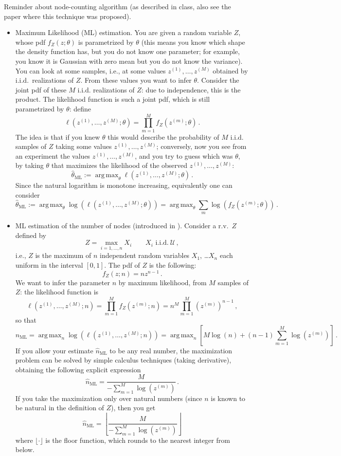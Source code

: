 \documentclass{article}
\DeclareMathOperator*{\argmax}{arg \, max}
\begin{document}
Reminder about node-counting algorithm (as described in class, also see the paper \cite{node-counting} where this technique was proposed).
\begin{itemize}
\item Maximum Likelihood (ML) estimation. You are given a random variable $Z$, whose pdf
$f_Z(z;\theta)$ is parametrized by $\theta$ (this means you know which shape the density function has, but you do not know one parameter; for example, you know it is Gaussian with zero mean but you do not know the variance). You can look at some samples, i.e., at some values $z^{(1)}, \dots, z^{(M)}$ obtained by  i.i.d.~realizations of $Z$. From these values you want to infer $\theta$. Consider the joint pdf of these $M$ i.i.d. realizations of $Z$: due to independence, this is the product. The likelihood function is such a joint pdf, which is still parametrized by $\theta$: define
\[ \ell(z^{(1)}, \dots, z^{(M)}; \theta) = \prod_{m=1}^M f_Z(z^{(m)}; \theta) \,. \]
The idea is that if you knew $\theta$ this would describe the probability of $M$ i.i.d. samples of $Z$ taking some values $z^{(1)}, \dots, z^{(M)}$; conversely, now you see from an experiment the values $z^{(1)}, \dots, z^{(M)}$, and you try to guess which was $\theta$, by taking $\theta$ that maximizes the likelihood of the observed $z^{(1)}, \dots, z^{(M)}$:
\[ \hat \theta_{\mathrm{ML}} := \argmax_{\theta} \ell(z^{(1)}, \dots, z^{(M)}; \theta) \,. \]
Since the natural logarithm is monotone increasing, equivalently one can consider
\[ \hat \theta_{\mathrm{ML}} := \argmax_{\theta} \log (\ell(z^{(1)}, \dots, z^{(M)}; \theta))
= \argmax_{\theta} \sum_{m} \log (f_Z(z^{(m)}; \theta)) \,.\]
\item ML estimation of the number of nodes (introduced in \cite{node-counting}).
Consider a r.v.~$Z$ defined by
\[Z = \max_{i=1, \dots, n} X_i \qquad X_i \text{ i.i.d.}~\mathcal U \, ,\]
i.e., $Z$ is the maximum of $n$ independent random variables $X_1$, \dots $X_n$ each uniform in the interval $[0,1]$.
The pdf of $Z$ is the following:
\[ f_Z(z;n) = n z^{n-1} \,.\]
We want to infer the parameter $n$ by maximum likelihood, from $M$ samples of $Z$:
the likelihood function is
\[ \ell(z^{(1)}, \dots, z^{(M)}; n) = \prod_{m=1}^M f_Z(z^{(m)}; n) = n^M \prod_{m=1}^M (z^{(m)})^{n-1} \,, \]
so that
\[ \hat n_{\mathrm{ML}} = \argmax_n \log(\ell(z^{(1)}, \dots, z^{(M)}; n))
= \argmax_n [ M \log(n) +(n-1) \sum_{m=1}^M \log(z^{(m)}) ] \,.\]
If you allow your estimate $\hat n_{\mathrm{ML}} $ to be any real number, the maximization problem
can be solved by simple calculus techniques (taking derivative), obtaining the following explicit expression
\[\hat n_{\mathrm{ML}} = \frac{M}{-\sum_{m=1}^M \log(z^{(m)})} \,.\]
If you take the maximization only over natural numbers (since $n$ is known to be natural in the definition of $Z$), then you get
\[ \hat n_{\mathrm{ML}} = \left \lfloor \frac{M}{-\sum_{m=1}^M \log(z^{(m)})} \right \rfloor  \]
where $\lfloor \cdot \rfloor$ is the floor function, which rounds to the nearest integer from below.


\end{itemize}
\end{document}
